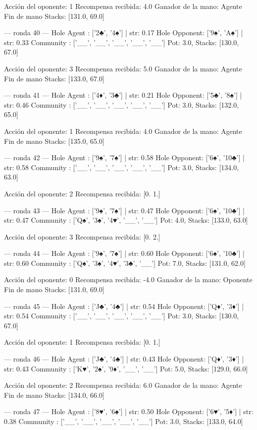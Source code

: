 Acción del oponente: 1
Recompensa recibida: 4.0
Ganador de la mano: Agente
Fin de mano Stacks: [131.0, 69.0]


--- ronda 40 ---
Hole Agent : ['2♣', '4♠'] | str: 0.17
Hole Opponent: ['9♠', 'A♠'] | str: 0.33
Community  : ['__', '__', '__', '__', '__']
Pot: 3.0, Stacks: [130.0, 67.0]

Acción del oponente: 3
Recompensa recibida: 5.0
Ganador de la mano: Agente
Fin de mano Stacks: [133.0, 67.0]


--- ronda 41 ---
Hole Agent : ['4♦', '3♣'] | str: 0.21
Hole Opponent: ['5♣', '8♠'] | str: 0.46
Community  : ['__', '__', '__', '__', '__']
Pot: 3.0, Stacks: [132.0, 65.0]

Acción del oponente: 1
Recompensa recibida: 4.0
Ganador de la mano: Agente
Fin de mano Stacks: [135.0, 65.0]


--- ronda 42 ---
Hole Agent : ['9♠', '7♠'] | str: 0.58
Hole Opponent: ['6♠', '10♣'] | str: 0.58
Community  : ['__', '__', '__', '__', '__']
Pot: 3.0, Stacks: [134.0, 63.0]

Acción del oponente: 2
Recompensa recibida: [0. 1.]

--- ronda 43 ---
Hole Agent : ['9♠', '7♠'] | str: 0.47
Hole Opponent: ['6♠', '10♣'] | str: 0.47
Community  : ['Q♠', '3♠', '4♥', '__', '__']
Pot: 4.0, Stacks: [133.0, 63.0]

Acción del oponente: 3
Recompensa recibida: [0. 2.]

--- ronda 44 ---
Hole Agent : ['9♠', '7♠'] | str: 0.60
Hole Opponent: ['6♠', '10♣'] | str: 0.60
Community  : ['Q♠', '3♠', '4♥', '3♣', '__']
Pot: 7.0, Stacks: [131.0, 62.0]

Acción del oponente: 0
Recompensa recibida: -4.0
Ganador de la mano: Oponente
Fin de mano Stacks: [131.0, 69.0]


--- ronda 45 ---
Hole Agent : ['J♣', '4♣'] | str: 0.54
Hole Opponent: ['Q♦', '3♦'] | str: 0.54
Community  : ['__', '__', '__', '__', '__']
Pot: 3.0, Stacks: [130.0, 67.0]

Acción del oponente: 1
Recompensa recibida: [0. 1.]

--- ronda 46 ---
Hole Agent : ['J♣', '4♣'] | str: 0.43
Hole Opponent: ['Q♦', '3♦'] | str: 0.43
Community  : ['K♥', '2♠', '9♦', '__', '__']
Pot: 5.0, Stacks: [129.0, 66.0]

Acción del oponente: 2
Recompensa recibida: 6.0
Ganador de la mano: Agente
Fin de mano Stacks: [134.0, 66.0]


--- ronda 47 ---
Hole Agent : ['8♥', '6♠'] | str: 0.50
Hole Opponent: ['6♥', '5♦'] | str: 0.38
Community  : ['__', '__', '__', '__', '__']
Pot: 3.0, Stacks: [133.0, 64.0]

